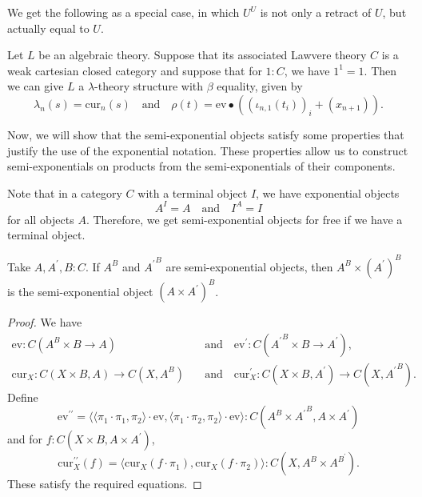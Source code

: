 We get the following as a special case, in which $ U^U $ is not only a retract of $ U $, but actually equal to $ U $.
\begin{corollary}
  Let $ L $ be an algebraic theory. Suppose that its associated Lawvere theory $ C $ is a weak cartesian closed category and suppose that for $ 1 : C $, we have $ 1^1 = 1 $. Then we can give $ L $ a $ \lambda $-theory structure with $ \beta $ equality, given by
  \[ \lambda_n(s) = \mathrm{cur}_n(s) \quad \text{and} \quad \rho(t) = \mathrm{ev} \bullet ((\iota_{n, 1}(t_i))_i + (x_{n + 1})). \]
\end{corollary}

Now, we will show that the semi-exponential objects satisfy some properties that justify the use of the exponential notation. These properties allow us to construct semi-exponentials on products from the semi-exponentials of their components.
\begin{remark}
  Note that in a category $ C $ with a terminal object $ I $, we have exponential objects
  \[ A^I = A \quad \text{and} \quad I^A = I \]
  for all objects $ A $. Therefore, we get semi-exponential objects for free if we have a terminal object.
\end{remark}

\begin{lemma}
  Take $ A, A^\prime, B : C $. If $ A^B $ and $ {A^\prime}^B $ are semi-exponential objects, then $ A^B \times (A^\prime)^B $ is the semi-exponential object $ (A \times A^\prime)^B $.
\end{lemma}
\begin{proof}
  We have
  \begin{align*}
    \mathrm{ev} : C(A^B \times B \to A) \quad &\text{and} \quad \mathrm{ev}^\prime : C({A^\prime}^B \times B \to A^\prime),\\
    \mathrm{cur}_X: C(X \times B, A) \to C(X, A^B) \quad &\text{and} \quad \mathrm{cur}^\prime_X: C(X \times B, A^\prime) \to C(X, {A^\prime}^B).
  \end{align*}
  Define
  \[ \mathrm{ev}^{\prime \prime} = \langle \langle \pi_1 \cdot \pi_1, \pi_2 \rangle \cdot \mathrm{ev}, \langle \pi_1 \cdot \pi_2, \pi_2 \rangle \cdot \mathrm{ev} \rangle : C(A^B \times {A^\prime}^B, A \times A^\prime) \]
  and for $ f: C(X \times B, A \times A^\prime) $,
  \[ \mathrm{cur}^{\prime \prime}_X(f) = \langle \mathrm{cur}_X(f \cdot \pi_1), \mathrm{cur}_X(f \cdot \pi_2) \rangle : C(X, A^B \times A^{B^\prime}). \]
  These satisfy the required equations.
\end{proof}

